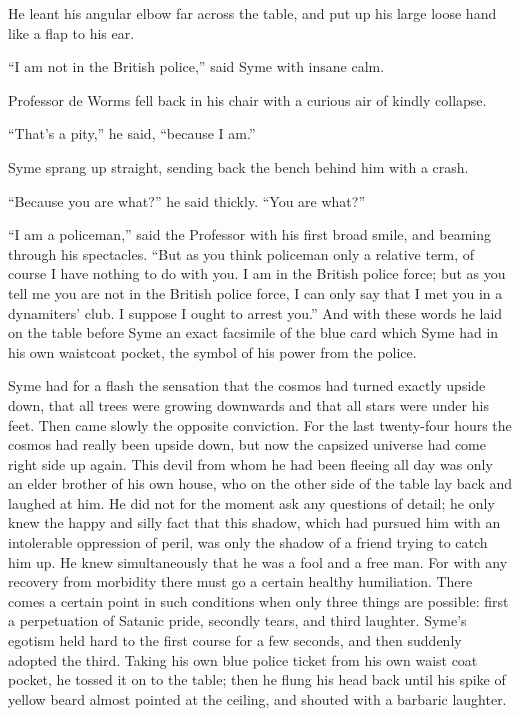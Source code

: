 He leant his angular elbow far across the table, and put up his large loose hand like a flap to his ear.

“I am not in the British police,” said Syme with insane calm.

Professor de Worms fell back in his chair with a curious air of kindly collapse.

“That’s a pity,” he said, “because I am.”

Syme sprang up straight, sending back the bench behind him with a crash.

“Because you are what?” he said thickly. “You are what?”

“I am a policeman,” said the Professor with his first broad smile, and beaming through his spectacles. “But as you think policeman only a relative term, of course I have nothing to do with you. I am in the British police force; but as you tell me you are not in the British police force, I can only say that I met you in a dynamiters’ club. I suppose I ought to arrest you.” And with these words he laid on the table before Syme an exact facsimile of the blue card which Syme had in his own waistcoat pocket, the symbol of his power from the police.

Syme had for a flash the sensation that the cosmos had turned exactly upside down, that all trees were growing downwards and that all stars were under his feet. Then came slowly the opposite conviction. For the last twenty-four hours the cosmos had really been upside down, but now the capsized universe had come right side up again. This devil from whom he had been fleeing all day was only an elder brother of his own house, who on the other side of the table lay back and laughed at him. He did not for the moment ask any questions of detail; he only knew the happy and silly fact that this shadow, which had pursued him with an intolerable oppression of peril, was only the shadow of a friend trying to catch him up. He knew simultaneously that he was a fool and a free man. For with any recovery from morbidity there must go a certain healthy humiliation. There comes a certain point in such conditions when only three things are possible: first a perpetuation of Satanic pride, secondly tears, and third laughter. Syme’s egotism held hard to the first course for a few seconds, and then suddenly adopted the third. Taking his own blue police ticket from his own waist coat pocket, he tossed it on to the table; then he flung his head back until his spike of yellow beard almost pointed at the ceiling, and shouted with a barbaric laughter.

